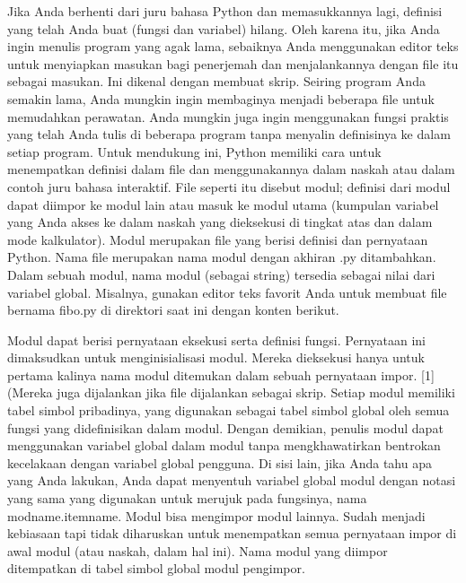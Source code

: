 Jika Anda berhenti dari juru bahasa Python dan memasukkannya lagi, definisi yang telah Anda buat (fungsi dan variabel) hilang. Oleh karena itu, jika Anda ingin menulis program yang agak lama, sebaiknya Anda menggunakan editor teks untuk menyiapkan masukan bagi penerjemah dan menjalankannya dengan file itu sebagai masukan. Ini dikenal dengan membuat skrip. Seiring program Anda semakin lama, Anda mungkin ingin membaginya menjadi beberapa file untuk memudahkan perawatan. Anda mungkin juga ingin menggunakan fungsi praktis yang telah Anda tulis di beberapa program tanpa menyalin definisinya ke dalam setiap program.
Untuk mendukung ini, Python memiliki cara untuk menempatkan definisi dalam file dan menggunakannya dalam naskah atau dalam contoh juru bahasa interaktif. File seperti itu disebut modul; definisi dari modul dapat diimpor ke modul lain atau masuk ke modul utama (kumpulan variabel yang Anda akses ke dalam naskah yang dieksekusi di tingkat atas dan dalam mode kalkulator).
Modul merupakan file yang berisi definisi dan pernyataan Python. Nama file merupakan nama modul dengan akhiran .py ditambahkan. Dalam sebuah modul, nama modul (sebagai string) tersedia sebagai nilai dari variabel global. Misalnya, gunakan editor teks favorit Anda untuk membuat file bernama fibo.py di direktori saat ini dengan konten berikut. 

Modul dapat berisi pernyataan eksekusi serta definisi fungsi. Pernyataan ini dimaksudkan untuk menginisialisasi modul. Mereka dieksekusi hanya untuk pertama kalinya nama modul ditemukan dalam sebuah pernyataan impor. [1] (Mereka juga dijalankan jika file dijalankan sebagai skrip.
Setiap modul memiliki tabel simbol pribadinya, yang digunakan sebagai tabel simbol global oleh semua fungsi yang didefinisikan dalam modul. Dengan demikian, penulis modul dapat menggunakan variabel global dalam modul tanpa mengkhawatirkan bentrokan kecelakaan dengan variabel global pengguna. Di sisi lain, jika Anda tahu apa yang Anda lakukan, Anda dapat menyentuh variabel global modul dengan notasi yang sama yang digunakan untuk merujuk pada fungsinya, nama modname.itemname.
Modul bisa mengimpor modul lainnya. Sudah menjadi kebiasaan tapi tidak diharuskan untuk menempatkan semua pernyataan impor di awal modul (atau naskah, dalam hal ini). Nama modul yang diimpor ditempatkan di tabel simbol global modul pengimpor.
